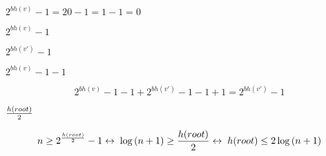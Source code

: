 \documentclass{article}
\begin{document}
$2^{bh(v)} - 1 = 20 - 1 = 1 - 1 = 0$
\pagebreak

$2^{bh(v)} - 1$
\pagebreak

$2^{bh(v')} - 1$
\pagebreak

$2^{bh(v)} - 1 - 1$
\pagebreak

\[2^{bh(v)} - 1 - 1 + 2^{bh(v')} - 1 - 1 + 1 = 2^{bh(v')} - 1\]
\pagebreak

$h(root) \over 2$
\pagebreak

\[n \geq 2^{{h(root) \over 2}} - 1 \leftrightarrow \; \log{(n+1)} \geq {h(root) \over 2} \leftrightarrow \; h(root) \leq 2\log{(n+1)}\]
\pagebreak
\end{document}
